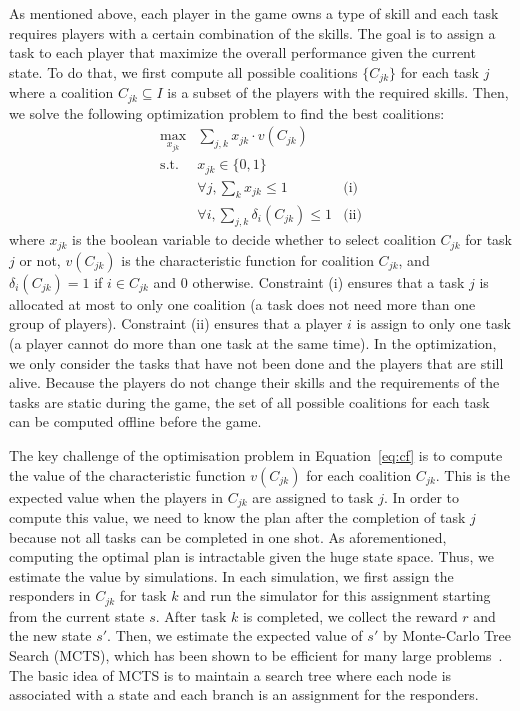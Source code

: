 As mentioned above, each player in the game owns a type of skill
and each task requires players with a certain combination of the
skills. The goal is to assign a task to each player that maximize
the overall performance given the current state. To do that, we
first compute all possible coalitions $\{ C_{jk} \}$ for each task
$j$ where a coalition $C_{jk} \subseteq I$ is a subset of the
players with the required skills. Then, we solve the following
optimization problem to find the best coalitions:
\begin{equation}
  \begin{array}{lll}
    \max_{x_{jk}} & \sum_{j, k} x_{jk} \cdot v(C_{jk}) & \\
    \mbox{s.t.} & x_{jk} \in \{0, 1\} & \\
    & \forall j, \sum_{k} x_{jk} \leq 1 & \mbox{(i)} \\
    & \forall i, \sum_{j, k} \delta_i(C_{jk}) \leq 1 & \mbox{(ii)}
  \end{array}
  \label{eq:cf}
\end{equation}
where $x_{jk}$ is the boolean variable to decide whether to select
coalition $C_{jk}$ for task $j$ or not, $v(C_{jk})$ is the
characteristic function for coalition $C_{jk}$, and
$\delta_i(C_{jk}) = 1$ if $i\in C_{jk}$ and 0 otherwise. Constraint
(i) ensures that a task $j$ is allocated at most to only one
coalition (a task does not need more than one group of players).
Constraint (ii) ensures that a player $i$ is assign to only one
task (a player cannot do more than one task at the same time). In
the optimization, we only consider the tasks that have not been
done and the players that are still alive. Because the players do
not change their skills and the requirements of the tasks are
static during the game, the set of all possible coalitions for each
task can be computed offline before the game.

The key challenge of the optimisation problem in
Equation~\ref{eq:cf} is to compute the value of the characteristic
function $v(C_{jk})$ for each coalition $C_{jk}$. This is the
expected value when the players in $C_{jk}$ are assigned to task
$j$. In order to compute this value, we need to know the plan after
the completion of task $j$ because not all tasks can be completed
in one shot. As aforementioned, computing the optimal plan is
intractable given the huge state space. Thus, we estimate the value
by simulations. In each simulation, we first assign the responders
in $C_{jk}$ for task $k$ and run the simulator for this assignment
starting from the current state $s$. After task $k$ is completed,
we collect the reward $r$ and the new state $s'$. Then, we estimate
the expected value of $s'$ by Monte-Carlo Tree Search (MCTS), which
has been shown to be efficient for many large problems~\cite{?}.
The basic idea of MCTS is to maintain a search tree where each node
is associated with a state and each branch is an assignment for the
responders.

